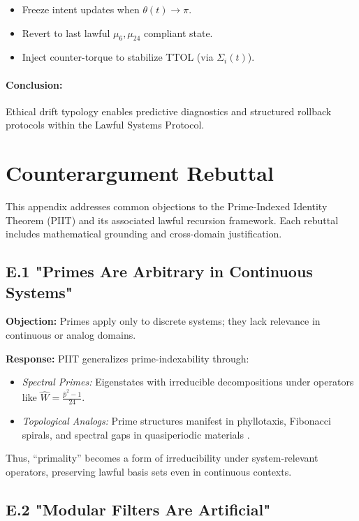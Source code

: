 \documentclass[12]{amsart}
\theoremstyle{plain}
\begin{document}
\begin{itemize}
  \item Freeze intent updates when $\theta(t) \to \pi$.
  \item Revert to last lawful $\mu_6, \mu_{24}$ compliant state.
  \item Inject counter-torque to stabilize TTOL (via $\Sigma_i(t)$).
\end{itemize}

\paragraph{Conclusion:} Ethical drift typology enables predictive diagnostics and structured rollback protocols within the Lawful Systems Protocol.

\clearpage

\section{Counterargument Rebuttal}

This appendix addresses common objections to the Prime-Indexed Identity Theorem (PIIT) and its associated lawful recursion framework. Each rebuttal includes mathematical grounding and cross-domain justification.

\subsection*{E.1 "Primes Are Arbitrary in Continuous Systems"}

\textbf{Objection:} Primes apply only to discrete systems; they lack relevance in continuous or analog domains.

\textbf{Response:}
PIIT generalizes prime-indexability through:
\begin{itemize}
  \item \textit{Spectral Primes:} Eigenstates with irreducible decompositions under operators like $\hat{W} = \frac{\hat{p}^2 - 1}{24}$.
  \item \textit{Topological Analogs:} Prime structures manifest in phyllotaxis, Fibonacci spirals, and spectral gaps in quasiperiodic materials \cite{steinhardt1987}.
\end{itemize}
Thus, “primality” becomes a form of irreducibility under system-relevant operators, preserving lawful basis sets even in continuous contexts.

\subsection*{E.2 "Modular Filters Are Artificial"}
\end{document}
